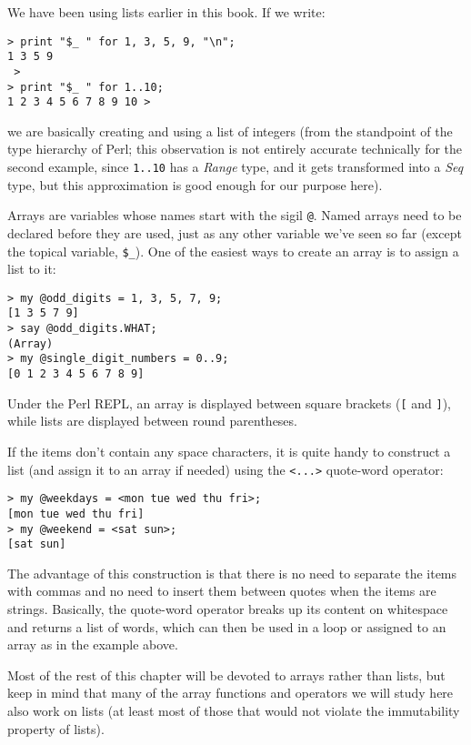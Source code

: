 We have been using lists earlier in this book. If we write:

\begin{verbatim}
> print "$_ " for 1, 3, 5, 9, "\n";
1 3 5 9
 >
> print "$_ " for 1..10;
1 2 3 4 5 6 7 8 9 10 >
\end{verbatim}

we are basically creating and using a list of integers (from 
the standpoint of the type hierarchy of Perl; this observation is 
not entirely accurate technically for the second example, since 
\verb'1..10' has a \emph{Range} type, and it gets 
transformed into a \emph{Seq} type, but this approximation is 
good enough for our purpose here).

Arrays are variables whose names start with the sigil \verb'@'.
Named arrays  need to be declared before they are used, just 
as any other variable we've seen so far (except the topical 
variable, \verb'$_'). One of the easiest 
ways to create an array is to assign a list to it:

\begin{verbatim}
> my @odd_digits = 1, 3, 5, 7, 9;
[1 3 5 7 9]
> say @odd_digits.WHAT;
(Array)
> my @single_digit_numbers = 0..9;
[0 1 2 3 4 5 6 7 8 9]
\end{verbatim}

Under the Perl REPL, an array is displayed between square 
brackets (\verb"[" and \verb"]"), while lists are displayed 
between round parentheses.

If the items don't contain any space characters, it is quite handy 
to construct a list (and assign it to an array if needed) using 
the \verb'<...>' quote-word operator:

\begin{verbatim}
> my @weekdays = <mon tue wed thu fri>;
[mon tue wed thu fri]
> my @weekend = <sat sun>;
[sat sun]
\end{verbatim}

The advantage of this construction is that there is no need to 
separate the items with commas and no need to insert them between 
quotes when the items are strings. Basically, 
the quote-word operator breaks up its content on whitespace 
and returns a list of words, which can then be 
used in a loop or assigned to an array as in the example 
above.

Most of the rest of this chapter will be devoted to arrays 
rather than lists, but keep in mind that many of the array 
functions and operators we will study here also work on lists 
(at least most of those that would not violate the 
immutability property of lists).
 

